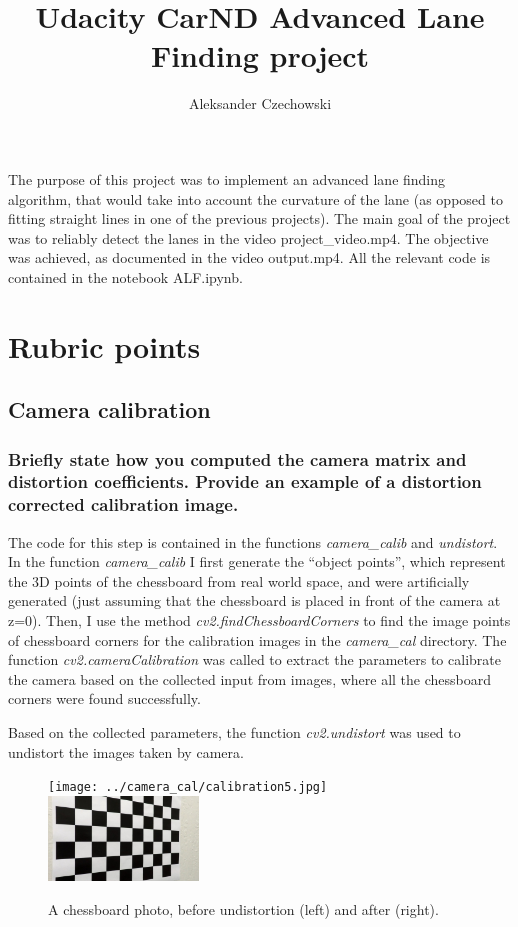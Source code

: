 \documentclass[a4paper,10pt]{article}
\begin{document}
\pagestyle{empty}
\noindent

\title{Udacity CarND Advanced Lane Finding project}
\author{Aleksander Czechowski}
\maketitle

The purpose of this project was to implement an advanced lane finding algorithm,
that would take into account the curvature of the lane (as opposed to fitting straight lines in one of the previous projects).
The main goal of the project was to reliably detect the lanes in the video project\_video.mp4.
The objective was achieved, as documented in the video output.mp4.
All the relevant code is contained in the notebook ALF.ipynb.

\section{Rubric points}

\subsection{Camera calibration}

\subsubsection{Briefly state how you computed the camera matrix and distortion coefficients. Provide an example of a distortion corrected calibration image.}


The code for this step is contained in the functions \emph{camera\_calib} and \emph{undistort}.
In the function \emph{camera\_calib} I first generate the ``object points'', which represent the 3D points of the chessboard from real world space,
and were artificially generated (just assuming that the chessboard is placed in front of the camera at z=0).
Then, I use the method \emph{cv2.findChessboardCorners} to find the image points of chessboard corners for
the calibration images in the \emph{camera\_cal} directory.
The function \emph{cv2.cameraCalibration} was called to extract the parameters to calibrate the camera based on the collected input
from images, where all the chessboard corners were found successfully.

Based on the collected parameters, the function \emph{cv2.undistort} was used to undistort the images taken by camera.

\begin{figure}[h]
  \begin{center}
    \texttt{[image: ../camera\_cal/calibration5.jpg]}
    \quad
    \includegraphics[width=40mm]{../output_images/calibrate.jpg}
  \caption{A chessboard photo, before undistortion (left) and after (right).}
\end{center}
\end{figure}
\end{document}
